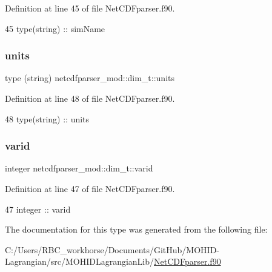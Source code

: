 Definition at line 45 of file Net\+C\+D\+Fparser.\+f90.


\begin{DoxyCode}
45         \textcolor{keywordtype}{type}(string) :: simName
\end{DoxyCode}
\mbox{\label{structnetcdfparser__mod_1_1dim__t_a42d4e5dd93905b5b6912dd7675d0e1db}} 
\subsubsection{\texorpdfstring{units}{units}}
{\footnotesize\ttfamily type (string) netcdfparser\+\_\+mod\+::dim\+\_\+t\+::units\hspace{0.3cm}{\ttfamily [private]}}



Definition at line 48 of file Net\+C\+D\+Fparser.\+f90.


\begin{DoxyCode}
48         type(string) :: units
\end{DoxyCode}
\mbox{\label{structnetcdfparser__mod_1_1dim__t_a850c5b53b1fa2c09e19ee37896065897}} 
\subsubsection{\texorpdfstring{varid}{varid}}
{\footnotesize\ttfamily integer netcdfparser\+\_\+mod\+::dim\+\_\+t\+::varid\hspace{0.3cm}{\ttfamily [private]}}



Definition at line 47 of file Net\+C\+D\+Fparser.\+f90.


\begin{DoxyCode}
47         \textcolor{keywordtype}{integer} :: varid
\end{DoxyCode}


The documentation for this type was generated from the following file\+:\begin{DoxyCompactItemize}
\item 
C\+:/\+Users/\+R\+B\+C\+\_\+workhorse/\+Documents/\+Git\+Hub/\+M\+O\+H\+I\+D-\/\+Lagrangian/src/\+M\+O\+H\+I\+D\+Lagrangian\+Lib/\mbox{\hyperlink{_net_c_d_fparser_8f90}{Net\+C\+D\+Fparser.\+f90}}\end{DoxyCompactItemize}
